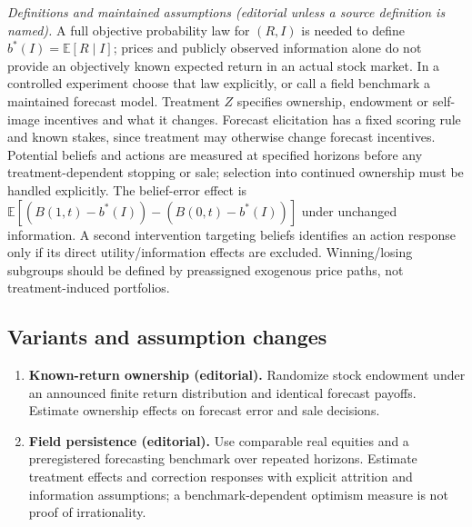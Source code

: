 \documentclass[11pt,a4paper]{article}
\begin{document}
\emph{Definitions and maintained assumptions (editorial unless a source definition is named).} A full objective probability law for \((R,I)\) is needed to define \(b^*(I)=\mathbb E[R\mid I]\); prices and publicly observed information alone do not provide an objectively known expected return in an actual stock market. In a controlled experiment choose that law explicitly, or call a field benchmark a maintained forecast model. Treatment \(Z\) specifies ownership, endowment or self-image incentives and what it changes. Forecast elicitation has a fixed scoring rule and known stakes, since treatment may otherwise change forecast incentives. Potential beliefs and actions are measured at specified horizons before any treatment-dependent stopping or sale; selection into continued ownership must be handled explicitly. The belief-error effect is \(\mathbb E[(B(1,t)-b^*(I))-(B(0,t)-b^*(I))]\) under unchanged information. A second intervention targeting beliefs identifies an action response only if its direct utility/information effects are excluded. Winning/losing subgroups should be defined by preassigned exogenous price paths, not treatment-induced portfolios.
\subsection*{Variants and assumption changes}
\begin{enumerate}
\item \textbf{Known-return ownership (editorial).} Randomize stock endowment under an announced finite return distribution and identical forecast payoffs. Estimate ownership effects on forecast error and sale decisions.
\item \textbf{Field persistence (editorial).} Use comparable real equities and a preregistered forecasting benchmark over repeated horizons. Estimate treatment effects and correction responses with explicit attrition and information assumptions; a benchmark-dependent optimism measure is not proof of irrationality.
\end{enumerate}
\end{document}
